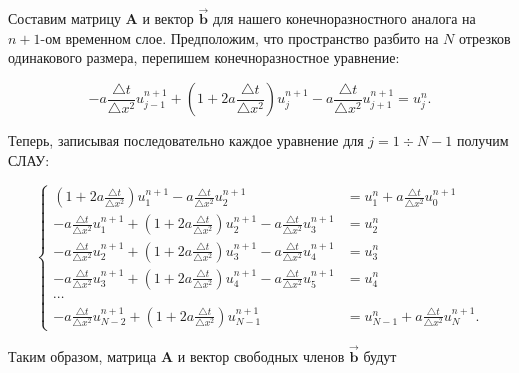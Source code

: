 \documentclass[12pt,a4paper]{article}
\begin{document}
		Составим матрицу $\mathbf{A}$ и вектор $\vec{\mathbf{b}}$ для нашего конечноразностного аналога на $n+1$-ом временном слое. Предположим, что пространство разбито на $N$ отрезков одинакового размера, перепишем конечноразностное уравнение:

		\begin{equation}
			- a \frac{\triangle t}{\triangle x^{2}} u^{n+1}_{j-1} + \left( 1 + 2 a \frac{\triangle t}{\triangle x^{2}} \right) u^{n+1}_{j} - a \frac{\triangle t}{\triangle x^{2}} u^{n+1}_{j+1} = u^{n}_{j}.
		\end{equation}

		Теперь, записывая последовательно каждое уравнение для $j=1 \div N - 1$ получим СЛАУ:

		\begin{equation}
			\begin{cases}
				\left( 1 + 2 a \frac{\triangle t}{\triangle x^{2}} \right) u^{n+1}_{1} - a \frac{\triangle t}{\triangle x^{2}} u^{n+1}_{2} &= u^{n}_{1} + a \frac{\triangle t}{\triangle x^{2}} u^{n+1}_{0} \\
				- a \frac{\triangle t}{\triangle x^{2}} u^{n+1}_{1} + \left( 1 + 2 a \frac{\triangle t}{\triangle x^{2}} \right) u^{n+1}_{2} - a \frac{\triangle t}{\triangle x^{2}} u^{n+1}_{3} &= u^{n}_{2} \\
				- a \frac{\triangle t}{\triangle x^{2}} u^{n+1}_{2} + \left( 1 + 2 a \frac{\triangle t}{\triangle x^{2}} \right) u^{n+1}_{3} - a \frac{\triangle t}{\triangle x^{2}} u^{n+1}_{4} &= u^{n}_{3} \\
				- a \frac{\triangle t}{\triangle x^{2}} u^{n+1}_{3} + \left( 1 + 2 a \frac{\triangle t}{\triangle x^{2}} \right) u^{n+1}_{4} - a \frac{\triangle t}{\triangle x^{2}} u^{n+1}_{5} &= u^{n}_{4} \\
				\cdots \\
				- a \frac{\triangle t}{\triangle x^{2}} u^{n+1}_{N-2} + \left( 1 + 2 a \frac{\triangle t}{\triangle x^{2}} \right) u^{n+1}_{N-1} &= u^{n}_{N-1} + a \frac{\triangle t}{\triangle x^{2}} u^{n+1}_{N}.
			\end{cases}
		\end{equation}

		Таким образом, матрица $\mathbf{A}$ и вектор свободных членов $\vec{\mathbf{b}}$ будут
\end{document}
